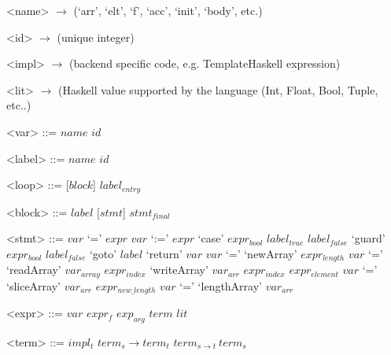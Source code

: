 
\setlength{\grammarindent}{5em} %
\renewcommand{\syntleft}{\normalfont\itshape} %
\renewcommand{\syntright}{}
\renewcommand{\litleft}{\ttfamily} %
\renewcommand{\litright}{}

\setlength{\grammarparsep}{0pt} %

\begin{grammar}
<name> $\rightarrow$ (`arr', `elt', `f', `acc', `init', `body', etc.)

<id>   $\rightarrow$ (unique integer\footnotemark)

<impl> $\rightarrow$ (backend specific code, e.g. TemplateHaskell expression)

<lit>  $\rightarrow$ (Haskell value supported by the language (Int, Float, Bool, Tuple, etc..)

<var>  ::= $name$ $id$

<label> ::= $name$ $id$

\end{grammar}

\setlength{\grammarparsep}{10pt plus 1pt minus 1pt} %
\begin{grammar}
<loop> ::= [$block$] $label_{entry}$

<block> ::= $label$ [$stmt$] $stmt_{final}$

<stmt> ::= $var$ `=' $expr$
      \alt $var$ `:=' $expr$
      \alt `case' $expr_{bool}$ $label_{true}$ $label_{false}$
      \alt `guard' $expr_{bool}$ $label_{false}$
      \alt `goto' $label$
      \alt `return' $var$
      \alt $var$ `=' `newArray' $expr_{length}$
      \alt $var$ `=' `readArray' $var_{array}$ $expr_{index}$
      \alt `writeArray' $var_{arr}$ $expr_{index}$ $expr_{element}$
      \alt $var$ `=' `sliceArray' $var_{arr}$ $expr_{new\_length}$
      \alt $var$ `=' `lengthArray' $var_{arr}$

<expr> ::= $var$
      \alt $expr_{\mathit{f}}$ $exp_{arg}$
      \alt $term$
      \alt $lit$

<term> ::= $impl_{t}$
      \alt $term_{s} \rightarrow term_{t}$
      \alt $term_{s \rightarrow t}\ term_{s}$

\end{grammar}
